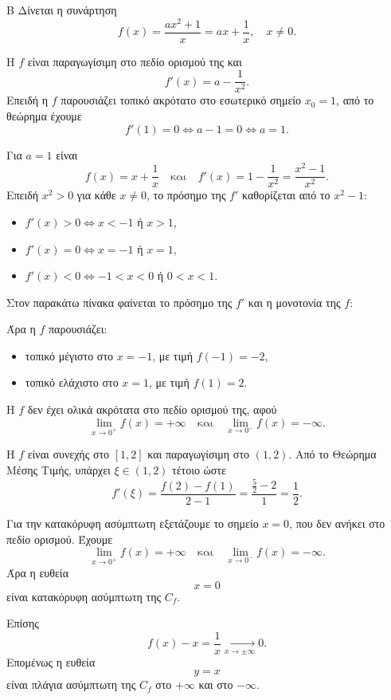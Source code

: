 \begin{thema}{Β}
Δίνεται η συνάρτηση
\[
f(x)=\frac{ax^2+1}{x}=ax+\frac{1}{x},\quad x\neq0.
\]

\begin{erwthma}
\item Η $f$ είναι παραγωγίσιμη στο πεδίο ορισμού της και
\[
f'(x)=a-\frac{1}{x^2}.
\]
Επειδή η $f$ παρουσιάζει τοπικό ακρότατο στο εσωτερικό σημείο $x_0=1$, από το θεώρημα  έχουμε
\[
f'(1)=0\Leftrightarrow a-1=0\Leftrightarrow a=1.
\]

\item Για $a=1$ είναι
\[
f(x)=x+\frac{1}{x}
\quad\text{και}\quad
f'(x)=1-\frac{1}{x^2}=\frac{x^2-1}{x^2}.
\]
Επειδή $x^2>0$ για κάθε $x\neq0$, το πρόσημο της $f'$ καθορίζεται από το $x^2-1$:
\begin{itemize}
\item $f'(x)>0\Leftrightarrow x<-1$ ή $x>1$,
\item $f'(x)=0\Leftrightarrow x=-1$ ή $x=1$,
\item $f'(x)<0\Leftrightarrow -1<x<0$ ή $0<x<1$.
\end{itemize}
Στον παρακάτω πίνακα φαίνεται το πρόσημο της $f'$ και η μονοτονία της $f$:
\begin{center}
\end{center}
Άρα η $f$ παρουσιάζει:
\begin{itemize}
\item τοπικό μέγιστο στο $x=-1$, με τιμή $f(-1)=-2$,
\item τοπικό ελάχιστο στο $x=1$, με τιμή $f(1)=2$.
\end{itemize}
Η $f$ δεν έχει ολικά ακρότατα στο πεδίο ορισμού της, αφού
\[
\lim_{x\to0^+}f(x)=+\infty
\quad\text{και}\quad
\lim_{x\to0^-}f(x)=-\infty.
\]

\item Η $f$ είναι συνεχής στο $[1,2]$ και παραγωγίσιμη στο $(1,2)$. Από το Θεώρημα Μέσης Τιμής, υπάρχει $\xi\in(1,2)$ τέτοιο ώστε
\[
f'(\xi)=\frac{f(2)-f(1)}{2-1}
=\frac{\frac{5}{2}-2}{1}
=\frac{1}{2}.
\]

\item Για την κατακόρυφη ασύμπτωτη εξετάζουμε το σημείο $x=0$, που δεν ανήκει στο πεδίο ορισμού. Έχουμε
\[
\lim_{x\to0^+}f(x)=+\infty
\quad\text{και}\quad
\lim_{x\to0^-}f(x)=-\infty.
\]
Άρα η ευθεία
\[
x=0
\]
είναι κατακόρυφη ασύμπτωτη της $C_f$.

Επίσης
\[
f(x)-x=\frac{1}{x}\xrightarrow[x\to\pm\infty]{}0.
\]
Επομένως η ευθεία
\[
y=x
\]
είναι πλάγια ασύμπτωτη της $C_f$ στο $+\infty$ και στο $-\infty$.
\end{erwthma}
\end{thema}

